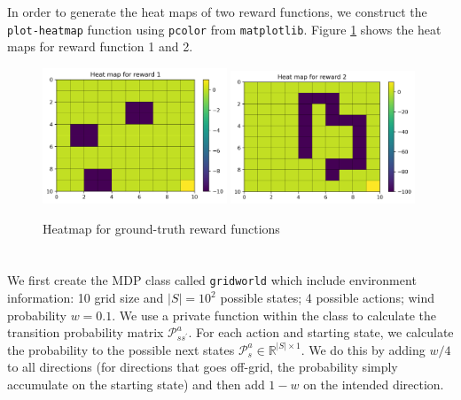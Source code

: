 \section{}\label{sec:1}
In order to generate the heat maps of two reward functions, we construct the \verb"plot-heatmap" function using \verb"pcolor" from \verb"matplotlib". Figure \ref{fig: heatmap1} shows the heat maps for reward function 1 and 2.

\begin{figure}[!htb]
\centering
  \includegraphics[width=0.49\textwidth]{images/Q1-9/Heat-map-for-reward-1.png}
  \includegraphics[width=0.49\textwidth]{images/Q1-9/Heat-map-for-reward-2.png}
  \caption{Heatmap for ground-truth reward functions}
\label{fig: heatmap1}
\end{figure}

\section{}\label{sec:2}
We first create the MDP class called \verb"gridworld" which include environment information: 10 grid size and $|S|=10^2$ possible states; 4 possible actions; wind probability $w=0.1$. We use a private function within the class to calculate the transition probability matrix $\mathcal{P}_{s s^{\prime}}^a$. For each action and starting state, we calculate the probability to the possible next states $\mathcal{P}_s^a \in \mathbb{R}^{|S|\times1}$. We do this by adding $w/4$ to all directions (for directions that goes off-grid, the probability simply accumulate on the starting state) and then add $1-w$ on the intended direction.

